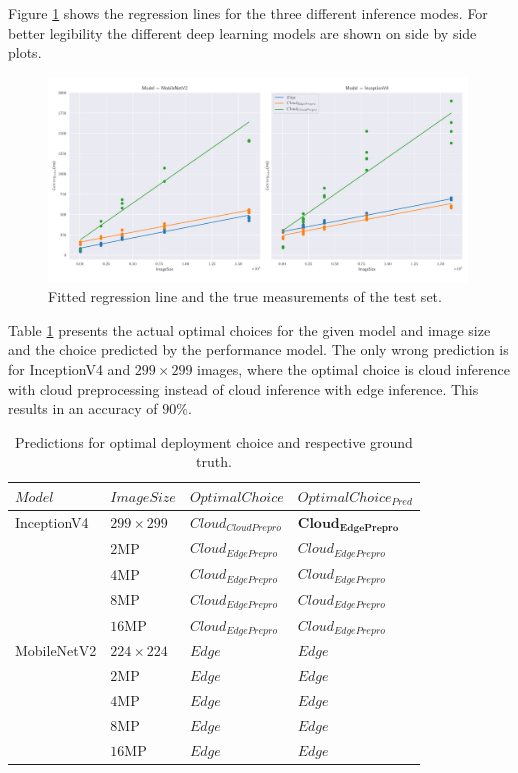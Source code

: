 Figure \ref{fig:regression} shows the regression lines for the three different inference modes.
For better legibility the different deep learning models are shown on side by side plots.

\begin{figure}[!htb]
\centering
\includegraphics[width=0.99\textwidth]{./Bilder/regression.pdf}
\caption{Fitted regression line and the true measurements of the test set.}
\label{fig:regression}
\end{figure}

Table \ref{table:perfmofelpred} presents the actual optimal choices for the given model and image size and the choice predicted by the performance model.
The only wrong prediction is for InceptionV4 and $299\times299$ images, where the optimal choice is cloud inference with cloud preprocessing instead of cloud inference with edge inference.
This results in an accuracy of $90\%$.
\begin{table}[H]
\centering
\caption{Predictions for optimal deployment choice and respective ground truth.}
\label{table:perfmofelpred}
\begin{tabular}{@{}llll@{}}
\toprule
$Model$ & $ImageSize$ & $OptimalChoice$ & $OptimalChoice_{Pred}$ \\ \midrule
InceptionV4 & $299\times299$ & $Cloud_{CloudPrepro}$ & $\mathbf{Cloud_{EdgePrepro}}$ \\
 & $2$MP & $Cloud_{EdgePrepro}$ & $Cloud_{EdgePrepro}$ \\
 & $4$MP & $Cloud_{EdgePrepro}$ & $Cloud_{EdgePrepro}$ \\
 & $8$MP & $Cloud_{EdgePrepro}$ & $Cloud_{EdgePrepro}$ \\
 & $16$MP & $Cloud_{EdgePrepro}$ & $Cloud_{EdgePrepro}$ \\
MobileNetV2 & $224\times224$ & $Edge$ & $Edge$ \\
 & $2$MP & $Edge$ & $Edge$ \\
 & $4$MP & $Edge$ & $Edge$ \\
 & $8$MP & $Edge$ & $Edge$ \\ 
 & $16$MP & $Edge$ & $Edge$ \\ \bottomrule
\end{tabular}
\end{table}




